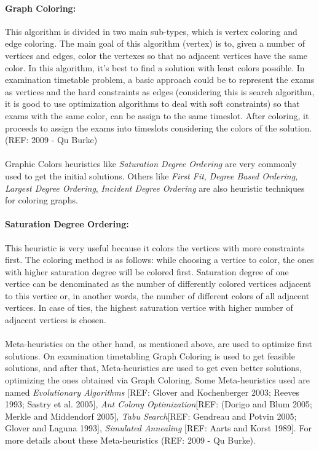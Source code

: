 \paragraph{Graph Coloring:}
This algorithm is divided in two main sub-types, which is vertex coloring and edge coloring. The main goal of this algorithm (vertex) is to, given a number of vertices and edges, color the vertexes so that no adjacent vertices have the same color. In this algorithm, it's best to find a solution with least colors possible. In examination timetable problem, a basic approach could be to represent the exams as vertices and the hard constraints as edges (considering this is search algorithm, it is good to use optimization algorithms to deal with soft constraints) so that exams with the same color, can be assign to the same timeslot. After coloring, it proceeds to assign the exams into timeslots considering the colors of the solution. (REF: 2009 - Qu Burke)\\
\\
Graphic Colors heuristics like \textit{Saturation Degree Ordering} are very commonly used to get the initial solutions. Others like \textit{First Fit}, \textit{Degree Based Ordering}, \textit{Largest Degree Ordering}, \textit{Incident Degree Ordering} are also heuristic techniques for coloring graphs.
\\
\paragraph{Saturation Degree Ordering:}
This heuristic is very useful because it colors the vertices with more constraints first. The coloring method is as follows: while choosing a vertice to color, the ones with higher saturation degree will be colored first. Saturation degree of one vertice can be denominated as the number of differently colored vertices adjacent to this vertice or, in another words, the number of different colors of all adjacent vertices. In case of ties, the highest saturation vertice with higher number of adjacent vertices is chosen.\\
\\
Meta-heuristics on the other hand, as mentioned above, are used to optimize first solutions. On examination timetabling Graph Coloring is used to get feasible solutions, and after that, Meta-heuristics are used to get even better solutions, optimizing the ones obtained via Graph Coloring. Some Meta-heuristics used are named \textit{Evolutionary Algorithms} [REF: Glover and Kochenberger 2003; Reeves 1993; Sastry et al. 2005], \textit{Ant Colony Optimization}[REF: (Dorigo and Blum 2005; Merkle and Middendorf 2005], \textit{Tabu Search}[REF: Gendreau and Potvin 2005; Glover and Laguna 1993], \textit{Simulated Annealing} [REF: Aarts and Korst 1989]. For more details about these Meta-heuristics (REF: 2009 - Qu Burke).


